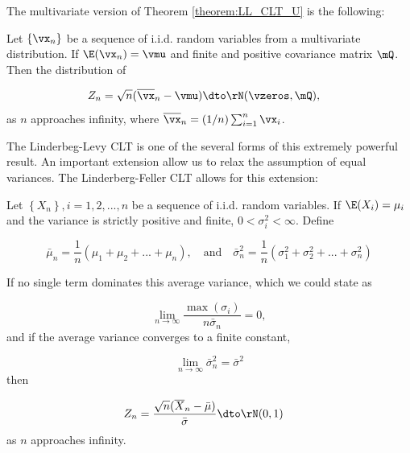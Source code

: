 The multivariate version of Theorem \ref{theorem:LL_CLT_U} is the following:


\begin{theorem}\label{theorem:LL_CLT_M}
Let $\left\lbrace \vx_n \right\rbrace$ be a sequence of i.i.d. random variables from a multivariate distribution. If $\E(\vx_n) = \vmu$ and finite and positive covariance matrix $\mQ$. Then the distribution of

\begin{equation*}
  \begin{aligned}
      Z_n & = \sqrt{n}(\overline{\vx}_n - \vmu) \dto \rN(\vzeros, \mQ), 
  \end{aligned}
\end{equation*}
%
as $n$ approaches infinity, where $\overline{\vx}_n = (1 / n)\sum_{i = 1}^n\vx_i$.
\end{theorem}

The Linderbeg-Levy CLT is one of the several forms of this extremely powerful result. An important extension allow us to relax the assumption of equal variances. The Linderberg-Feller CLT allows for this extension:

\begin{theorem}\label{theorem:LF_CLT_U}
Let $\left\lbrace X_n\right\rbrace, i = 1, 2,...,n$ be a sequence of i.i.d. random variables. If $\E(X_i) = \mu_i$ and the variance is strictly positive and finite, $0 < \sigma^2_i < \infty$. Define 

\begin{equation*}
  \bar{\mu}_n = \frac{1}{n}(\mu_1 + \mu_2 + ... +\mu_n), \quad \mbox{and} \quad \bar{\sigma}^2_n =\frac{1}{n}(\sigma^2_1 + \sigma^2_2 + ... +\sigma^2_n)
\end{equation*}

If no single term dominates this average variance, which we could state as

\begin{equation*}
\lim_{n\to \infty} \frac{\max (\sigma_i)}{n \bar{\sigma}_n} = 0,
\end{equation*}
%
and if the average variance converges to a finite constant,

\begin{equation*}
\lim_{n\to \infty} \bar{\sigma}^2_n = \bar{\sigma}^2
\end{equation*}
%
then

\begin{equation*}
  \begin{aligned}
      Z_n &  = \frac{\sqrt{n}(\overline{X}_n - \bar{\mu})}{\bar{\sigma}} \dto \rN(0, 1)
  \end{aligned}
\end{equation*}
%
 as $n$ approaches infinity.
\end{theorem}

